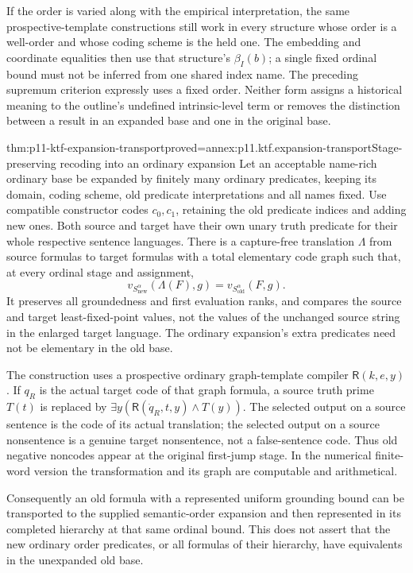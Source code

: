 If the order is varied along with the empirical interpretation, the
same prospective-template constructions still work in every structure
whose order is a well-order and whose coding scheme is the held one.
The embedding and coordinate equalities then use that structure's
\(\beta_I(b)\); a single fixed ordinal bound must not be inferred
from one shared index name. The preceding supremum criterion expressly
uses a fixed order. Neither form assigns a historical meaning to the
outline's undefined intrinsic-level term or removes the distinction
between a result in an expanded base and one in the original base.

\begin{hbtheorem}{thm:p11-ktf-expansion-transport}{proved=annex:p11.ktf.expansion-transport}{Stage-preserving recoding into an ordinary expansion}
Let an acceptable name-rich ordinary base be expanded by finitely many
ordinary predicates, keeping its domain, coding scheme, old predicate
interpretations and all names fixed. Use compatible constructor codes
\(c_0,c_1\), retaining the old predicate indices and adding new ones.
Both source and target have their own unary truth predicate for their
whole respective sentence languages. There is a capture-free translation
\(\Lambda\) from source formulas to target formulas with a total
elementary code graph such that, at every ordinal stage and assignment,
\[
 v_{S^{\alpha}_{\mathrm{new}}}(\Lambda(F),g)
       =v_{S^{\alpha}_{\mathrm{old}}}(F,g).
\]
It preserves all groundedness and first evaluation ranks, and compares
the source and target least-fixed-point values, not the values of the
unchanged source string in the enlarged target language. The ordinary
expansion's extra predicates need not be elementary in the old base.

The construction uses a prospective ordinary graph-template compiler
\(\mathsf R(k,e,y)\). If \(q_R\) is the actual target code
of that graph formula, a source truth prime \(T(t)\) is replaced by
\(\exists y(\mathsf R(\dot q_R,t,y)\land T(y))\).
The selected output on a source sentence is the code of its actual
translation; the selected output on a source nonsentence is a genuine
target nonsentence, not a false-sentence code. Thus old negative noncodes
appear at the original first-jump stage. In the numerical finite-word
version the transformation and its graph are computable and arithmetical.

Consequently an old formula with a represented uniform grounding bound
can be transported to the supplied semantic-order expansion and then
represented in its completed hierarchy at that same ordinal bound.
This does not assert that the new ordinary order predicates, or all
formulas of their hierarchy, have equivalents in the unexpanded old base.
\end{hbtheorem}
